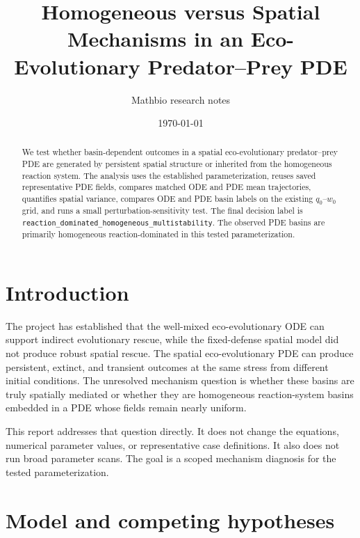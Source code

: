 \documentclass[11pt]{article}
\title{Homogeneous versus Spatial Mechanisms in an Eco-Evolutionary Predator--Prey PDE}
\author{Mathbio research notes}
\date{\today}
\begin{document}
\maketitle

\begin{abstract}
We test whether basin-dependent outcomes in a spatial eco-evolutionary predator--prey PDE are generated by persistent spatial structure or inherited from the homogeneous reaction system. The analysis uses the established parameterization, reuses saved representative PDE fields, compares matched ODE and PDE mean trajectories, quantifies spatial variance, compares ODE and PDE basin labels on the existing \(q_0\)--\(w_0\) grid, and runs a small perturbation-sensitivity test. The final decision label is \texttt{reaction\_dominated\_homogeneous\_multistability}. The observed PDE basins are primarily homogeneous reaction-dominated in this tested parameterization.
\end{abstract}

\section{Introduction}

The project has established that the well-mixed eco-evolutionary ODE can support indirect evolutionary rescue, while the fixed-defense spatial model did not produce robust spatial rescue. The spatial eco-evolutionary PDE can produce persistent, extinct, and transient outcomes at the same stress from different initial conditions. The unresolved mechanism question is whether these basins are truly spatially mediated or whether they are homogeneous reaction-system basins embedded in a PDE whose fields remain nearly uniform.

This report addresses that question directly. It does not change the equations, numerical parameter values, or representative case definitions. It also does not run broad parameter scans. The goal is a scoped mechanism diagnosis for the tested parameterization.

\section{Model and competing hypotheses}
\end{document}
